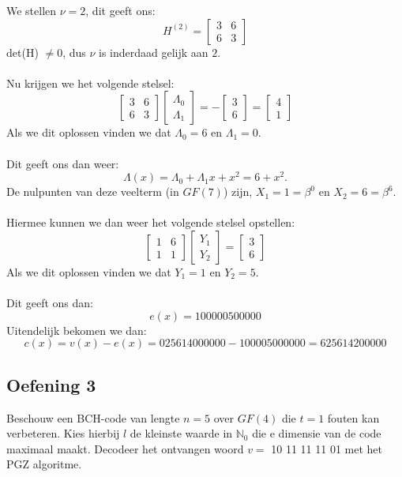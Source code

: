 \documentclass[11pt,a4paper,titlepage]{article}
\begin{document}
\begin{enumerate}[label=(\alph*)]
We stellen $\nu = 2$, dit geeft ons:
	$$H^{(2)} = \begin{bmatrix}
       3 & 6\\
	6 & 3
     \end{bmatrix}$$
det(H) $\neq 0$, dus $\nu$ is inderdaad gelijk aan $2$. \\ \\
Nu krijgen we het volgende stelsel:
	$$\begin{bmatrix}
       3 & 6\\
	6 & 3
	\end{bmatrix} \begin{bmatrix}\Lambda _0 \\ \Lambda _1\end{bmatrix} = - \begin{bmatrix}3 \\ 6\end{bmatrix} = \begin{bmatrix}4 \\ 1\end{bmatrix}$$
Als we dit oplossen vinden we dat $\Lambda _0 = 6$ en $\Lambda _1 = 0$.\\ \\
Dit geeft ons dan weer:
	$$\Lambda (x) = \Lambda _0 +  \Lambda _1 x + x^2 = 6 + x^2.$$
De nulpunten van deze veelterm (in $GF(7)$) zijn, $X_1 = 1 = \beta ^0$ en $X_2 = 6 = \beta ^6$.\\ \\
Hiermee kunnen we dan weer het volgende stelsel opstellen:
		$$\begin{bmatrix}
       1&6\\
	1 & 1
	\end{bmatrix} \begin{bmatrix}Y_1 \\ Y_2\end{bmatrix} = \begin{bmatrix}3 \\ 6\end{bmatrix} $$
Als we dit oplossen vinden we dat $Y _1 = 1$ en $Y _2 = 5$.\\ \\
Dit geeft ons dan:
	$$e(x) = 100000500000$$
Uitendelijk bekomen we dan:
	$$c(x) = v(x) - e(x) = 025614000000-100005000000 = 625614200000$$
\end{enumerate}
\subsection{Oefening 3}
Beschouw een BCH-code van lengte $n=5$ over $GF(4)$ die $t=1$ fouten kan verbeteren. Kies hierbij $l$ de kleinste waarde in $\mathbb{N}_0$ die e dimensie van de code maximaal maakt. Decodeer het ontvangen woord $v =$ 10 11 11 11 01 met het PGZ algoritme.
\end{document}
